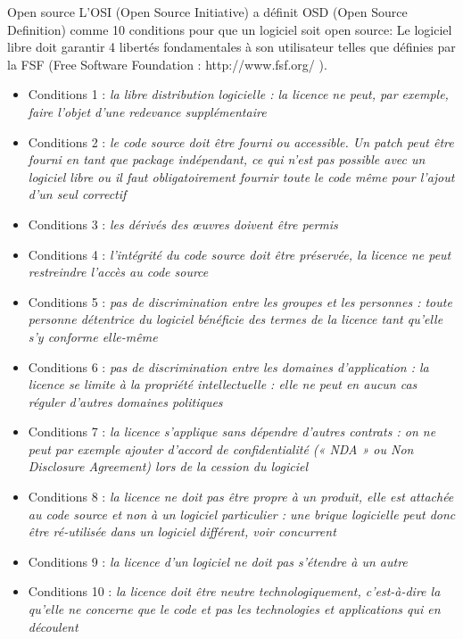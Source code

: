 \documentclass{beamer}
\begin{document}
\begin{frame}{Open source}
	L'OSI (Open Source Initiative) a définit OSD (Open Source Definition) comme 10 conditions pour que un logiciel soit open source:
	Le logiciel libre doit garantir 4 libertés fondamentales à son utilisateur telles que définies par la FSF (Free Software Foundation : http://www.fsf.org/ ).
	\onslide<2->
	\tiny
	\begin{itemize}
	\item Conditions 1 : \textit{la libre distribution logicielle : la licence ne peut, par exemple, faire l’objet d’une redevance supplémentaire}
	\item Conditions 2 : \textit{le code source doit être fourni ou accessible. Un patch peut être fourni en tant que package indépendant, ce qui n’est pas possible avec un logiciel libre ou il faut obligatoirement fournir toute le code même pour l’ajout d’un seul correctif}
	\item Conditions 3 : \textit{les dérivés des œuvres doivent être permis}
	\item Conditions 4 : \textit{l’intégrité du code source doit être préservée, la licence ne peut restreindre l’accès au code source} 
	\item Conditions 5 : \textit{ pas de discrimination entre les groupes et les personnes : toute personne détentrice du logiciel bénéficie des termes de la licence tant qu’elle s’y conforme elle-même}
	\item Conditions 6 : \textit{pas de discrimination entre les domaines d’application : la licence se limite à la propriété intellectuelle : elle ne peut en aucun cas réguler d’autres domaines politiques}
	\item Conditions 7 : \textit{la licence s’applique sans dépendre d’autres contrats : on ne peut par exemple ajouter d’accord de confidentialité (« NDA » ou Non Disclosure Agreement) lors de la cession du logiciel}
	\item Conditions 8 : \textit{la licence ne doit pas être propre à un produit, elle est attachée au code source et non à un logiciel particulier : une brique logicielle peut donc être ré-utilisée dans un logiciel différent, voir concurrent}
	\item Conditions 9 : \textit{la licence d’un logiciel ne doit pas s’étendre à un autre}
	\item Conditions 10 : \textit{la licence doit être neutre technologiquement, c’est-à-dire la qu’elle ne concerne que le code et pas les technologies et applications qui en découlent}
	\end{itemize}
	\normalsize
\end{frame}
\end{document}
